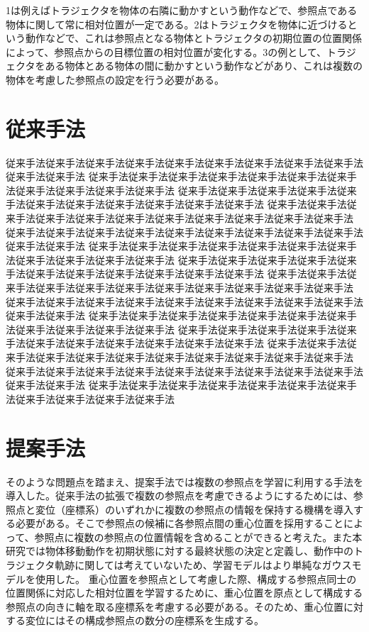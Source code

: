 1は例えばトラジェクタを物体の右隣に動かすという動作などで、参照点である物体に関して常に相対位置が一定である。2はトラジェクタを物体に近づけるという動作などで、これは参照点となる物体とトラジェクタの初期位置の位置関係によって、参照点からの目標位置の相対位置が変化する。3の例として、トラジェクタをある物体とある物体の間に動かすという動作などがあり、これは複数の物体を考慮した参照点の設定を行う必要がある。

\section{従来手法}

従来手法従来手法従来手法従来手法従来手法従来手法従来手法従来手法従来手法従来手法従来手法
従来手法従来手法従来手法従来手法従来手法従来手法従来手法従来手法従来手法従来手法従来手法
従来手法従来手法従来手法従来手法従来手法従来手法従来手法従来手法従来手法従来手法従来手法
従来手法従来手法従来手法従来手法従来手法従来手法従来手法従来手法従来手法従来手法従来手法
従来手法従来手法従来手法従来手法従来手法従来手法従来手法従来手法従来手法従来手法従来手法
従来手法従来手法従来手法従来手法従来手法従来手法従来手法従来手法従来手法従来手法従来手法
従来手法従来手法従来手法従来手法従来手法従来手法従来手法従来手法従来手法従来手法従来手法
従来手法従来手法従来手法従来手法従来手法従来手法従来手法従来手法従来手法従来手法従来手法
従来手法従来手法従来手法従来手法従来手法従来手法従来手法従来手法従来手法従来手法従来手法
従来手法従来手法従来手法従来手法従来手法従来手法従来手法従来手法従来手法従来手法従来手法
従来手法従来手法従来手法従来手法従来手法従来手法従来手法従来手法従来手法従来手法従来手法
従来手法従来手法従来手法従来手法従来手法従来手法従来手法従来手法従来手法従来手法従来手法
従来手法従来手法従来手法従来手法従来手法従来手法従来手法従来手法従来手法従来手法従来手法
従来手法従来手法従来手法従来手法従来手法従来手法従来手法従来手法従来手法従来手法従来手法

\section{提案手法}

そのような問題点を踏まえ、提案手法では複数の参照点を学習に利用する手法を導入した。従来手法の拡張で複数の参照点を考慮できるようにするためには、参照点と変位（座標系）のいずれかに複数の参照点の情報を保持する機構を導入する必要がある。そこで参照点の候補に各参照点間の重心位置を採用することによって、参照点に複数の参照点の位置情報を含めることができると考えた。また本研究では物体移動動作を初期状態に対する最終状態の決定と定義し、動作中のトラジェクタ軌跡に関しては考えていないため、学習モデルはより単純なガウスモデルを使用した。
重心位置を参照点として考慮した際、構成する参照点同士の位置関係に対応した相対位置を学習するために、重心位置を原点として構成する参照点の向きに軸を取る座標系を考慮する必要がある。そのため、重心位置に対する変位にはその構成参照点の数分の座標系を生成する。

